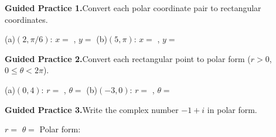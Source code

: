 \documentclass[10pt]{article}
\begin{document}
\begin{practicebox}

\textbf{Guided Practice 1.}\quad Convert each polar coordinate pair to
rectangular coordinates.

\vspace{4pt}
(a)\quad $(2, \pi/6)$: $x = $ \underline{\hspace{2cm}}, $y = $ \underline{\hspace{2cm}} \hfill
(b)\quad $(5, \pi)$: $x = $ \underline{\hspace{2cm}}, $y = $ \underline{\hspace{2cm}}

\vspace{0.10in}
\textbf{Guided Practice 2.}\quad Convert each rectangular point to polar form
($r > 0$, $0 \le \theta < 2\pi$).

\vspace{4pt}
(a)\quad $(0, 4)$: $r = $ \underline{\hspace{1.5cm}}, $\theta = $ \underline{\hspace{1.5cm}} \hfill
(b)\quad $(-3, 0)$: $r = $ \underline{\hspace{1.5cm}}, $\theta = $ \underline{\hspace{1.5cm}}

\vspace{0.10in}
\textbf{Guided Practice 3.}\quad Write the complex number $-1 + i$ in polar form.

\vspace{4pt}
$r = $ \underline{\hspace{1.5cm}} \quad $\theta = $ \underline{\hspace{1.5cm}} \quad
Polar form: \underline{\hspace{4.5cm}}

\end{practicebox}
\end{document}
